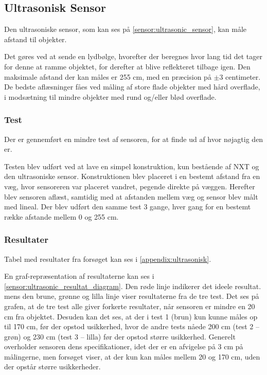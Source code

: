 \subsection{Ultrasonisk Sensor}
Den ultrasoniske sensor, som kan ses på \cref{sensor:ultrasonic_sensor}, kan måle afstand til objekter.

Det gøres ved at sende en lydbølge, hvorefter der beregnes hvor lang tid det tager for denne at ramme objektet, for derefter at blive reflekteret tilbage igen.
Den maksimale afstand der kan måles er 255 cm, med en præcision på $\pm 3$ centimeter.
De bedste aflæsninger fåes ved måling af store flade objekter med hård overflade, i modsætning til mindre objekter med rund og/eller blød overflade.\cite{nxt}

\subsubsection{Test}
Der er gennemført en mindre test af sensoren, for at finde ud af hvor nøjagtig den er.

Testen blev udført ved at lave en simpel \lego konstruktion, kun bestående af NXT og den ultrasoniske sensor.
Konstruktionen blev placeret i en bestemt afstand fra en væg, hvor sensoreren var placeret vandret, pegende direkte på væggen.
Herefter blev sensoren aflæst, samtidig med at afstanden mellem væg og sensor blev målt med lineal.
Der blev udført den samme test 3 gange, hver gang for en bestemt række afstande mellem 0 og 255 cm.

\subsubsection{Resultater}\label{sensorer:us:resultater} Tabel med resultater fra forsøget kan ses i \cref{appendix:ultrasonisk}.

En graf-repræsentation af resultaterne kan ses i \cref{sensor:ultrasonic_resultat_diagram}.
Den røde linje indikerer det ideele resultat. mens den brune, grønne og lilla linje viser resultaterne fra de tre test.
Det ses på grafen, at de tre test alle giver forkerte resultater, når sensoren er mindre en 20 cm fra objektet.
Desuden kan det ses, at der i test 1 (brun) kun kunne måles op til 170 cm, før der opstod usikkerhed, hvor de andre tests nåede 200 cm (test 2 -- grøn) og 230 cm (test 3 -- lilla) før der opstod større usikkerhed.
Generelt overholder sensoren dens specifikationer, idet der er en afvigelse på 3 cm på målingerne, men forsøget viser, at der kun kan måles mellem 20 og 170 cm, uden der opstår større usikkerheder.

